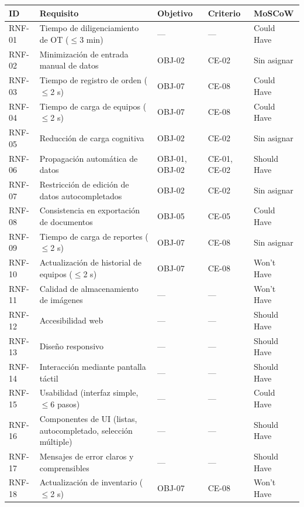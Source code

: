 \documentclass[12pt,varwidth=170mm,border=10pt]{standalone}
\newcommand{\hueco}{---}
\begin{document}
\begingroup
\small
\begin{center}
\begin{tabular}{|p{1.5cm}|p{5.1cm}|p{2.5cm}|p{2.1cm}|p{2.3cm}|}
\hline
\textbf{ID} & \textbf{Requisito} & \textbf{Objetivo} & \textbf{Criterio} & \textbf{MoSCoW} \\
\hline
RNF-01 & Tiempo de diligenciamiento de OT ($\leq$3 min) & \hueco{} & \hueco{} & Could Have \\
\hline
RNF-02 & Minimización de entrada manual de datos & OBJ-02 & CE-02 & Sin asignar \\
\hline
RNF-03 & Tiempo de registro de orden ($\leq$2 s) & OBJ-07 & CE-08 & Could Have \\
\hline
RNF-04 & Tiempo de carga de equipos ($\leq$2 s) & OBJ-07 & CE-08 & Could Have \\
\hline
RNF-05 & Reducción de carga cognitiva & OBJ-02 & CE-02 & Sin asignar \\
\hline
RNF-06 & Propagación automática de datos & OBJ-01, OBJ-02 & CE-01, CE-02 & Should Have \\
\hline
RNF-07 & Restricción de edición de datos autocompletados & OBJ-02 & CE-02 & Sin asignar \\
\hline
RNF-08 & Consistencia en exportación de documentos & OBJ-05 & CE-05 & Could Have \\
\hline
RNF-09 & Tiempo de carga de reportes ($\leq$2 s) & OBJ-07 & CE-08 & Sin asignar \\
\hline
RNF-10 & Actualización de historial de equipos ($\leq$2 s) & OBJ-07 & CE-08 & Won't Have \\
\hline
RNF-11 & Calidad de almacenamiento de imágenes & \hueco{} & \hueco{} & Won't Have \\
\hline
RNF-12 & Accesibilidad web & \hueco{} & \hueco{} & Should Have \\
\hline
RNF-13 & Diseño responsivo & \hueco{} & \hueco{} & Should Have \\
\hline
RNF-14 & Interacción mediante pantalla táctil & \hueco{} & \hueco{} & Should Have \\
\hline
RNF-15 & Usabilidad (interfaz simple, $\leq$6 pasos) & \hueco{} & \hueco{} & Could Have \\
\hline
RNF-16 & Componentes de UI (listas, autocompletado, selección múltiple) & \hueco{} & \hueco{} & Should Have \\
\hline
RNF-17 & Mensajes de error claros y comprensibles & \hueco{} & \hueco{} & Should Have \\
\hline
RNF-18 & Actualización de inventario ($\leq$2 s) & OBJ-07 & CE-08 & Won't Have \\

\end{tabular}
\end{center}
\end{document}
